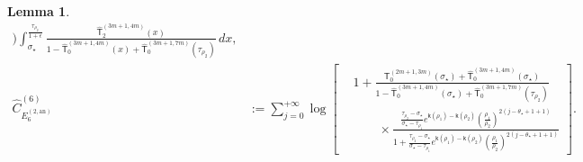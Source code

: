 \documentclass[a4paper]{article}
\newtheorem{lemma}[theorem]{Lemma}
\numberwithin{equation}{section}
\begin{document}
\begin{lemma}
\begin{align*}
\bigr)
\int_{\sigma_{\star}}^{\frac{\tau_{\rho_2}}{1+\epsilon}}
\frac{\widehat{\mathsf{T}}_{2}^{(3m+1,4m)}(x)}{1-\widehat{\mathsf{T}}_0^{(3m+1,4m)}(x)+\widehat{\mathsf{T}}_0^{(3m+1,7m)}(\tau_{\rho_2})}\,dx, 
\\
\widehat{C}_{E_{6}^{(2,\mathrm{an})}}^{(6)}  
&:=
\sum_{j=0}^{+\infty}
\log\left[\begin{aligned}&
1+\frac{\mathsf{T}_0^{(2m+1,3m)}(\sigma_{\star})+\widehat{\mathsf{T}}_0^{(3m+1,4m)}(\sigma_{\star})}{1-\widehat{\mathsf{T}}_0^{(3m+1,4m)}(\sigma_{\star})+\widehat{\mathsf{T}}_0^{(3m+1,7m)}(\tau_{\rho_2})}
\\
&\qquad\times\frac{
\frac{\tau_{\rho_2}-\sigma_{\star}}{\sigma_{\star}-\tau_{\rho_1}}
e^{\mathsf{k}(\rho_1)-\mathsf{k}(\rho_2)}
(\tfrac{\rho_1}{\rho_2})^{2(j-\theta_{\star}+1+1)}
}{
1+\frac{\tau_{\rho_2}-\sigma_{\star}}{\sigma_{\star}-\tau_{\rho_1}}e^{\mathsf{k}(\rho_1)-\mathsf{k}(\rho_2)}( \tfrac{\rho_1}{\rho_2})^{2(j-\theta_{\star}+1+1)}
}
\end{aligned}\right].
\end{align*}
\end{lemma}
\end{document}
